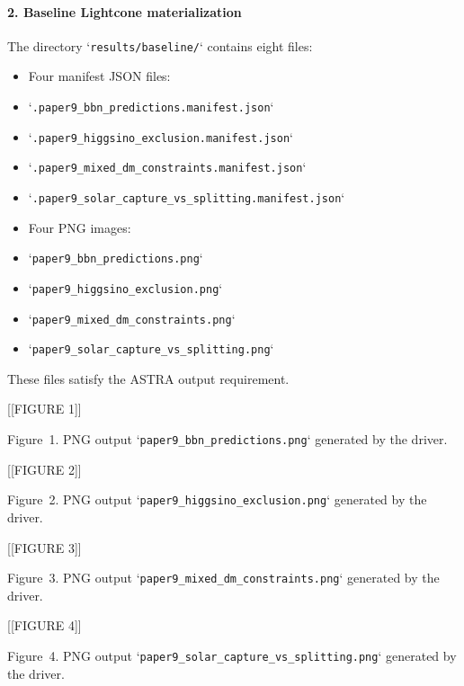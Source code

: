 \documentclass[11pt,a4paper]{article}
\begin{document}
\paragraph{2. Baseline Lightcone materialization}
The directory `\texttt{results/\allowbreak{}baseline/\allowbreak{}}` contains eight files:

\begin{itemize}
  \item Four manifest JSON files:
  \item `\texttt{.paper9\_\allowbreak{}bbn\_\allowbreak{}predictions.manifest.json}`
  \item `\texttt{.paper9\_\allowbreak{}higgsino\_\allowbreak{}exclusion.manifest.json}`
  \item `\texttt{.paper9\_\allowbreak{}mixed\_\allowbreak{}dm\_\allowbreak{}constraints.manifest.json}`
  \item `\texttt{.paper9\_\allowbreak{}solar\_\allowbreak{}capture\_\allowbreak{}vs\_\allowbreak{}splitting.manifest.json}`
  \item Four PNG images:
  \item `\texttt{paper9\_\allowbreak{}bbn\_\allowbreak{}predictions.png}`
  \item `\texttt{paper9\_\allowbreak{}higgsino\_\allowbreak{}exclusion.png}`
  \item `\texttt{paper9\_\allowbreak{}mixed\_\allowbreak{}dm\_\allowbreak{}constraints.png}`
  \item `\texttt{paper9\_\allowbreak{}solar\_\allowbreak{}capture\_\allowbreak{}vs\_\allowbreak{}splitting.png}`
\end{itemize}
These files satisfy the ASTRA output requirement.


[[FIGURE 1]]

Figure~1. PNG output `\texttt{paper9\_\allowbreak{}bbn\_\allowbreak{}predictions.png}` generated by the driver.


[[FIGURE 2]]

Figure~2. PNG output `\texttt{paper9\_\allowbreak{}higgsino\_\allowbreak{}exclusion.png}` generated by the driver.


[[FIGURE 3]]

Figure~3. PNG output `\texttt{paper9\_\allowbreak{}mixed\_\allowbreak{}dm\_\allowbreak{}constraints.png}` generated by the driver.


[[FIGURE 4]]

Figure~4. PNG output `\texttt{paper9\_\allowbreak{}solar\_\allowbreak{}capture\_\allowbreak{}vs\_\allowbreak{}splitting.png}` generated by the driver.
\end{document}
